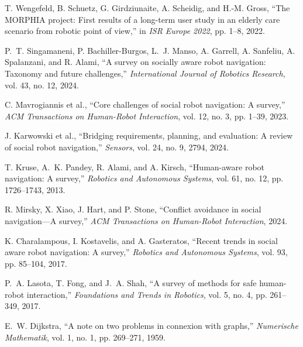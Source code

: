 \documentclass[12pt,a4paper,oneside]{book}
\begin{document}
\begin{enumerate}[label={[\arabic*]}, leftmargin=*]
\item \label{Wengefeld2022} T. Wengefeld, B. Schuetz, G. Girdziunaite, A. Scheidig, and H.-M. Gross, ``The MORPHIA project: First results of a long-term user study in an elderly care scenario from robotic point of view,'' in \emph{ISR Europe 2022}, pp. 1--8, 2022.

\item \label{Singamaneni2024} P.~T. Singamaneni, P. Bachiller-Burgos, L.~J. Manso, A. Garrell, A. Sanfeliu, A. Spalanzani, and R. Alami, ``A survey on socially aware robot navigation: Taxonomy and future challenges,'' \emph{International Journal of Robotics Research}, vol. 43, no. 12, 2024.

\item \label{Mavrogiannis2023} C. Mavrogiannis et al., ``Core challenges of social robot navigation: A survey,'' \emph{ACM Transactions on Human-Robot Interaction}, vol. 12, no. 3, pp. 1--39, 2023.

\item \label{Karwowski2024} J. Karwowski et al., ``Bridging requirements, planning, and evaluation: A review of social robot navigation,'' \emph{Sensors}, vol. 24, no. 9, 2794, 2024.

\item \label{Kruse2013} T. Kruse, A.~K. Pandey, R. Alami, and A. Kirsch, ``Human-aware robot navigation: A survey,'' \emph{Robotics and Autonomous Systems}, vol. 61, no. 12, pp. 1726--1743, 2013.

\item \label{Mirsky2024} R. Mirsky, X. Xiao, J. Hart, and P. Stone, ``Conflict avoidance in social navigation---A survey,'' \emph{ACM Transactions on Human-Robot Interaction}, 2024.

\item \label{Charalampous2017} K. Charalampous, I. Kostavelis, and A. Gasteratos, ``Recent trends in social aware robot navigation: A survey,'' \emph{Robotics and Autonomous Systems}, vol. 93, pp. 85--104, 2017.

\item \label{Lasota2017} P.~A. Lasota, T. Fong, and J.~A. Shah, ``A survey of methods for safe human-robot interaction,'' \emph{Foundations and Trends in Robotics}, vol. 5, no. 4, pp. 261--349, 2017.

\item \label{Dijkstra1959} E.~W. Dijkstra, ``A note on two problems in connexion with graphs,'' \emph{Numerische Mathematik}, vol. 1, no. 1, pp. 269--271, 1959.


\end{enumerate}
\end{document}
